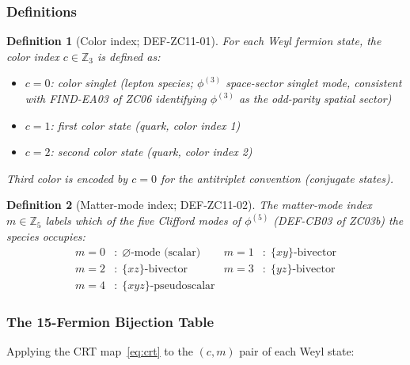 \documentclass[12pt, a4paper]{article}
\newtheorem{definition}{Definition}[section]
\begin{document}
\subsubsection{Definitions}

\begin{definition}[Color index; DEF-ZC11-01]
\label{def:color-index}
For each Weyl fermion state, the \emph{color index} $c \in \mathbb{Z}_3$
is defined as:
\begin{itemize}[leftmargin=*, noitemsep]
  \item $c = 0$: color singlet (lepton species; $\phi^{(3)}$ space-sector
    singlet mode, consistent with FIND-EA03 of ZC06 identifying
    $\phi^{(3)}$ as the odd-parity spatial sector)
  \item $c = 1$: first color state (quark, color index 1)
  \item $c = 2$: second color state (quark, color index 2)
\end{itemize}
Third color is encoded by $c = 0$ for the antitriplet convention
(conjugate states).
\end{definition}

\begin{definition}[Matter-mode index; DEF-ZC11-02]
\label{def:matter-index}
The \emph{matter-mode index} $m \in \mathbb{Z}_5$ labels which of the
five Clifford modes of $\phi^{(5)}$ (DEF-CB03 of ZC03b) the species
occupies:
\begin{align*}
m = 0&: \;\varnothing\text{-mode (scalar)} &
m = 1&: \;\{xy\}\text{-bivector} \\
m = 2&: \;\{xz\}\text{-bivector} &
m = 3&: \;\{yz\}\text{-bivector} \\
m = 4&: \;\{xyz\}\text{-pseudoscalar}
\end{align*}
\end{definition}

\subsubsection{The 15-Fermion Bijection Table}

Applying the CRT map~\eqref{eq:crt} to the $(c, m)$ pair of each
Weyl state:
\end{document}
